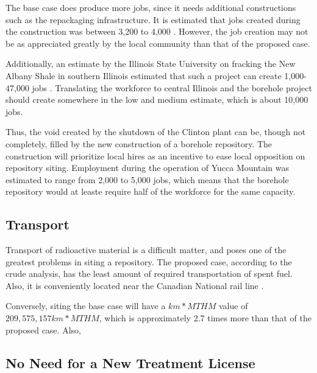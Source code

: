 The base case does produce more jobs, since it needs additional constructions such
as the repackaging infrastructure. It is estimated that jobs created during the
construction was between 3,200 to 4,000 \cite{Riddel_2003}.
 However, the job creation may not be as
appreciated greatly by the local community than that of the proposed case.

Additionally, an estimate by the Illinois State University on fracking the New Albany
Shale in southern Illinois estimated that such a project can create 1,000-47,000 jobs
\cite{Loomis_2012}. Translating the workforce to central Illinois and the borehole
project should create somewhere in the low and medium estimate, which is about 10,000
jobs.



Thus, the void created by the shutdown of the Clinton plant can be, though not
completely, filled by the new construction of a borehole repository. The construction
will prioritize local hires as an incentive to ease local opposition on repository
 siting. Employment during the operation of Yucca Mountain was estimated to range from
 2,000 to 5,000 jobs, \cite{Riddel_2003} which means that the borehole repository
 would at leaste require half of the workforce for the same capacity.  

\subsection{Transport}
Transport of radioactive material is a difficult matter, and poses one of the greatest
problems in siting a repository. The proposed case, according to the crude analysis,
has the least amount of required transportation of spent fuel. Also, it is
conveniently located near the Canadian National rail line \cite{waleed_regional_2015}. 




Conversely, siting the base case will have a $km*MTHM$ value of $209,575,157 km*MTHM$, 
which is approximately 2.7 times more than that of the proposed case. Also, %

\subsection{No Need for a New Treatment License}

